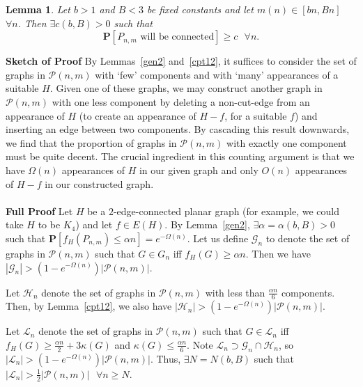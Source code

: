 \documentclass{article}
\newtheorem{Lemma}[Theorem]{Lemma}
\newtheorem{Proof of Theorem}{Proof of Theorem}
\begin{document}
\begin{Lemma} \label{conn1}
Let $b>1$ and $B<3$ be fixed constants and let $m(n) \in [bn,Bn]$~$\forall n$.
Then $\exists c(b,B)>0$ such that 
\begin{displaymath}
\mathbf{P}[P_{n,m} \textrm{ will be connected}] \geq c \textrm{ } \forall n.
\end{displaymath}
\end{Lemma}
\textbf{Sketch of Proof}
By Lemmas~\ref{gen2} and~\ref{cpt12}, 
it suffices to consider the set of graphs in $\mathcal{P}(n,m)$ with `few' components
and with `many' appearances of a suitable $H$.
Given one of these graphs, 
we may construct another graph in $\mathcal{P}(n,m)$ 
with one less component by deleting a non-cut-edge from an appearance of $H$
(to create an appearance of $H-f$, for a suitable $f$) and inserting an edge between two components.
By cascading this result downwards,
we find that the proportion of graphs in $\mathcal{P}(n,m)$ with exactly one component must be quite decent.
The crucial ingredient in this counting argument is that we have $\Omega (n)$ appearances of $H$ in our given graph
and only $O(n)$ appearances of $H-f$ in our constructed graph. \\
\\
\textbf{Full Proof}
Let $H$ be a $2$-edge-connected planar graph
(for example, we could take $H$ to be $K_{4}$)
and let $f \in E(H)$.
By Lemma~\ref{gen2}, $\exists \alpha = \alpha (b,B) > 0$ such that
$\mathbf{P}[f_{H}(P_{n,m}) \leq \alpha n] = e^{-\Omega(n)}.$
Let us define $\mathcal{G}_{n}$ to denote the set of graphs in $\mathcal{P}(n,m)$
such that $G \in G_{n}$ iff $f_{H}(G) \geq \alpha n$.
Then we have 
$|\mathcal{G}_{n}| > \left( 1 - e^{-\Omega(n)} \right) |\mathcal{P}(n,m)|$.

Let $\mathcal{H}_{n}$ denote the set of graphs in $\mathcal{P}(n,m)$
with less than $\frac{\alpha n}{6}$ components.
Then, by Lemma~\ref{cpt12},
we also have 
$|\mathcal{H}_{n}| > \left( 1 - e^{-\Omega(n)} \right) |\mathcal{P}(n,m)|$.

Let $\mathcal{L}_{n}$ denote the set of graphs in $\mathcal{P}(n,m)$
such that $G \in \mathcal{L}_{n}$ iff $f_{H}(G) \geq \frac{\alpha n}{2} + 3 \kappa (G)$
and $\kappa (G) \leq \frac{\alpha n}{6}$.
Note $\mathcal{L}_{n} \supset \mathcal{G}_{n} \cap \mathcal{H}_{n}$,
so $|\mathcal{L}_{n}| > \left( 1 \!-\! e^{-\Omega(n)} \right) |\mathcal{P}(n,m)|$.
Thus, $\exists N = N(b,B)$ such that
$|\mathcal{L}_{n}| > \frac{1}{2} |\mathcal{P}(n,m)| \textrm{ } \forall n \geq N$.
\end{document}
